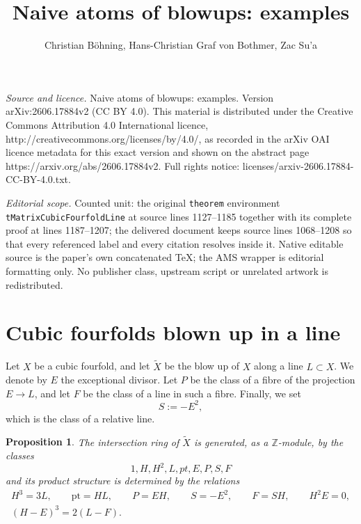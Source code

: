 \documentclass[10pt,a4paper]{amsart}
\newtheorem{proposition}[theorem]{Proposition}
\numberwithin{equation}{section}
\newcommand{\Z}{\mathbb Z}
\begin{document}
\title[Naive atoms of blowups: examples]{Naive atoms of blowups: examples}
\author{Christian Böhning, Hans-Christian Graf von Bothmer, Zac Su'a}
\date{}
\maketitle
\noindent\emph{Source and licence.} Naive atoms of blowups: examples. Version arXiv:2606.17884v2 (CC BY 4.0). This material is distributed under the Creative Commons Attribution 4.0 International licence, http://creativecommons.org/licenses/by/4.0/, as recorded in the arXiv OAI licence metadata for this exact version and shown on the abstract page https://arxiv.org/abs/2606.17884v2. Full rights notice: licenses/arxiv-2606.17884-CC-BY-4.0.txt.\par\smallskip
\noindent\textit{Editorial scope.} Counted unit: the original \texttt{theorem} environment \texttt{tMatrixCubicFourfoldLine} at source lines 1127--1185 together with its complete proof at lines 1187--1207; the delivered document keeps source lines 1068--1208 so that every referenced label and every citation resolves inside it. Native editable source is the paper's own concatenated TeX; the AMS wrapper is editorial formatting only. No publisher class, upstream script or unrelated artwork is redistributed.
\section{Cubic fourfolds blown up in a line}\label{sLine}

Let $X$ be a cubic fourfold, and let $\widetilde{X}$ be the blow up of $X$
along a line $L \subset X$. We denote by $E$ the exceptional divisor. Let
$P$ be the class of a fibre of the projection $E \to L$, and let $F$ be the
class of a line in such a fibre. Finally, we set
\[
S := -E^2,
\]
which is the class of a relative line.

\begin{proposition}\label{pIntersectionRing}
The intersection ring of $\widetilde{X}$ is generated, as a $\Z$-module,
by the classes
\[
    1,H,H^2,L,pt,E,P,S,F
\]
and its product structure is determined by the relations
\begin{gather*}
    H^3 = 3L, \qquad
    \mathrm{pt} = H L, \qquad
    P = E H, \qquad
    S = -E^2, \qquad
    F = S H, \qquad
    H^2E = 0, \\
    (H-E)^3 = 2(L-F).
\end{gather*}
\end{proposition}
\end{document}
